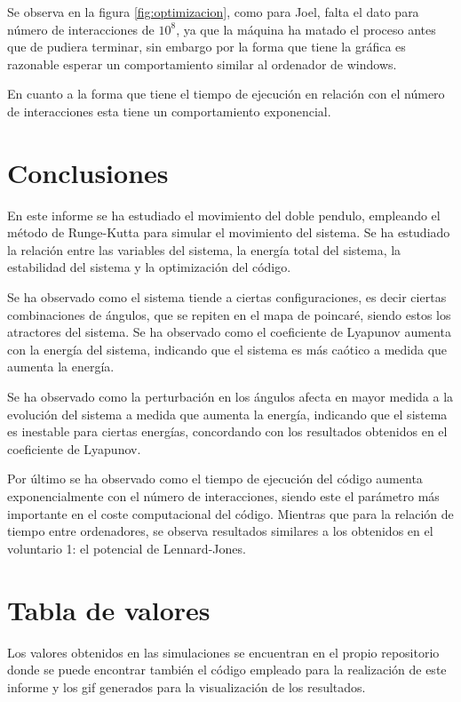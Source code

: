\documentclass[11pt, twoside]{article} %
\begin{document}
Se observa en la figura \ref{fig:optimizacion}, como para Joel, falta el dato 
para número de interacciones de $10^8$, ya que la máquina ha matado el proceso
antes que de pudiera terminar, sin embargo por la forma que tiene la gráfica es 
razonable esperar un comportamiento similar al ordenador de windows.

En cuanto a la forma que tiene el tiempo de ejecución en relación con el número 
de interacciones esta tiene un comportamiento exponencial.

\section{Conclusiones}

En este informe se ha estudiado el movimiento del doble pendulo, empleando el
método de Runge-Kutta para simular el movimiento del sistema. Se ha estudiado
la relación entre las variables del sistema, la energía total del sistema, la
estabilidad del sistema y la optimización del código.

Se ha observado como el sistema tiende a ciertas configuraciones, es decir
ciertas combinaciones de ángulos, que se repiten en el mapa de poincaré,
siendo estos los atractores del sistema. Se ha observado como el coeficiente
de Lyapunov aumenta con la energía del sistema, indicando que el sistema es
más caótico a medida que aumenta la energía.

Se ha observado como la perturbación en los ángulos afecta en mayor
medida a la evolución del sistema a medida que aumenta la energía, indicando
que el sistema es inestable para ciertas energías, concordando con los resultados
obtenidos en el coeficiente de Lyapunov.

Por último se ha observado como el tiempo de ejecución del código aumenta
exponencialmente con el número de interacciones, siendo este el parámetro
más importante en el coste computacional del código. Mientras que para la 
relación de tiempo entre ordenadores, se observa resultados similares 
a los obtenidos en el voluntario 1: el potencial de Lennard-Jones.

\newpage

\appendix

\section{Tabla de valores}

Los valores obtenidos en las simulaciones se encuentran en el propio repositorio
donde se puede encontrar también el código empleado para la realización 
de este informe y los gif generados para la visualización de los resultados.
\end{document}

